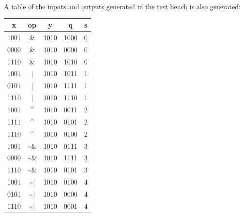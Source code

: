 \documentclass[paper=usletter, fontsize=12pt]{article}
\begin{document}
    A table of the inputs and outputs generated in the test bench is also generated:

    \begin{table}[h]

        \centering
        \begin{tabular*}{200pt}{@{\extracolsep{\fill}} ccccc}

            \textbf{x} & \textbf{op} & \textbf{y} & \textbf{q} & \textbf{s} \\
            \hline
            1001 & {\&} & 1010 & 1000 & 0 \\
            0000 & {\&} & 1010 & 0000 & 0 \\
            1110 & {\&} & 1010 & 1010 & 0 \\
            1001 & {|} & 1010 & 1011 & 1 \\
            0101 & {|} & 1010 & 1111 & 1 \\
            1110 & {|} & 1010 & 1110 & 1 \\
            1001 & \textasciicircum & 1010 & 0011 & 2 \\
            1111 & \textasciicircum & 1010 & 0101 & 2 \\
            1110 & \textasciicircum & 1010 & 0100 & 2 \\
            1001 & {\textasciitilde \&} & 1010 & 0111 & 3 \\
            0000 & {\textasciitilde \&} & 1010 & 1111 & 3 \\
            1110 & {\textasciitilde \&} & 1010 & 0101 & 3 \\
            1001 & {\textasciitilde | } & 1010 & 0100 & 4 \\
            0101 & {\textasciitilde | } & 1010 & 0000 & 4 \\
            1110 & {\textasciitilde | } & 1010 & 0001 & 4 \\
        \end{tabular*}
    \end{table}
\end{document}
